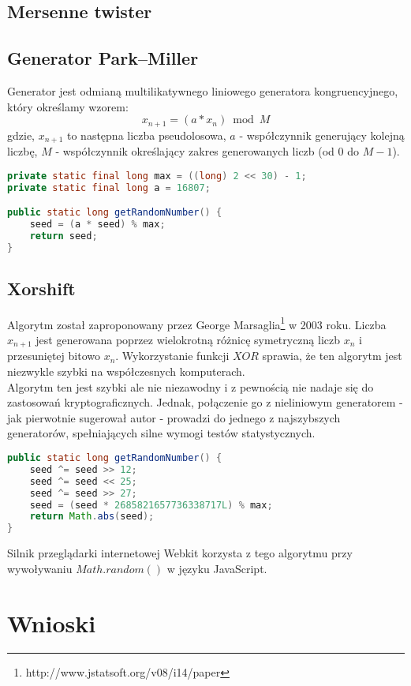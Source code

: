 \documentclass[a4paper, 11pt]{article} %
\begin{document}
\subsection{Mersenne twister}
\subsection{Generator Park–Miller}
Generator jest odmianą multilikatywnego liniowego generatora kongruencyjnego, który określamy wzorem:
\[ x_{n+1} = (a * x_{n}) \bmod M \]
gdzie, $x_{n+1}$ to następna liczba pseudolosowa, $a$ - współczynnik generujący kolejną liczbę, $M$ - współczynnik określający zakres generowanych liczb (od $0$ do $M-1$).
\begin{lstlisting}[style=mystyle, language=java, frame=single]
private static final long max = ((long) 2 << 30) - 1;
private static final long a = 16807;

public static long getRandomNumber() {
    seed = (a * seed) % max;
    return seed;
}
\end{lstlisting}
\subsection{Xorshift}
Algorytm został zaproponowany przez George Marsaglia\footnote{http://www.jstatsoft.org/v08/i14/paper} w 2003 roku. Liczba $x_{n+1}$ jest generowana poprzez wielokrotną różnicę symetryczną liczb $x_{n}$ i przesuniętej bitowo $x_{n}$. Wykorzystanie funkcji $XOR$ sprawia, że ten algorytm jest niezwykle szybki na współczesnych komputerach.
\\
Algorytm ten jest szybki ale nie niezawodny i z pewnością nie nadaje się do zastosowań kryptograficznych. Jednak, połączenie go z nieliniowym generatorem - jak pierwotnie sugerował autor - prowadzi do jednego z najszybszych generatorów, spełniających silne wymogi testów statystycznych.

\begin{lstlisting}[style=mystyle, language=java, frame=single]
public static long getRandomNumber() {
    seed ^= seed >> 12;
    seed ^= seed << 25;
    seed ^= seed >> 27;
    seed = (seed * 2685821657736338717L) % max;
    return Math.abs(seed);
}
\end{lstlisting}
Silnik przeglądarki internetowej Webkit korzysta z tego algorytmu przy wywoływaniu $Math.random()$ w języku JavaScript.
\section*{Wnioski}


%

%

\end{document}
